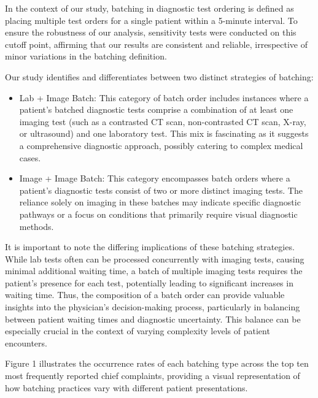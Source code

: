 \documentclass[,,nonblindrev]{informs}
\begin{document}
In the context of our study, batching in diagnostic test ordering is
defined as placing multiple test orders for a single patient within a
5-minute interval. To ensure the robustness of our analysis, sensitivity
tests were conducted on this cutoff point, affirming that our results
are consistent and reliable, irrespective of minor variations in the
batching definition.

Our study identifies and differentiates between two distinct strategies
of batching:

\begin{itemize}
\item
  Lab + Image Batch: This category of batch order includes instances
  where a patient's batched diagnostic tests comprise a combination of
  at least one imaging test (such as a contrasted CT scan,
  non-contrasted CT scan, X-ray, or ultrasound) and one laboratory test.
  This mix is fascinating as it suggests a comprehensive diagnostic
  approach, possibly catering to complex medical cases.
\item
  Image + Image Batch: This category encompasses batch orders where a
  patient's diagnostic tests consist of two or more distinct imaging
  tests. The reliance solely on imaging in these batches may indicate
  specific diagnostic pathways or a focus on conditions that primarily
  require visual diagnostic methods.
\end{itemize}

It is important to note the differing implications of these batching
strategies. While lab tests often can be processed concurrently with
imaging tests, causing minimal additional waiting time, a batch of
multiple imaging tests requires the patient's presence for each test,
potentially leading to significant increases in waiting time. Thus, the
composition of a batch order can provide valuable insights into the
physician's decision-making process, particularly in balancing between
patient waiting times and diagnostic uncertainty. This balance can be
especially crucial in the context of varying complexity levels of
patient encounters.

Figure 1 illustrates the occurrence rates of each batching type across
the top ten most frequently reported chief complaints, providing a
visual representation of how batching practices vary with different
patient presentations.
\end{document}
